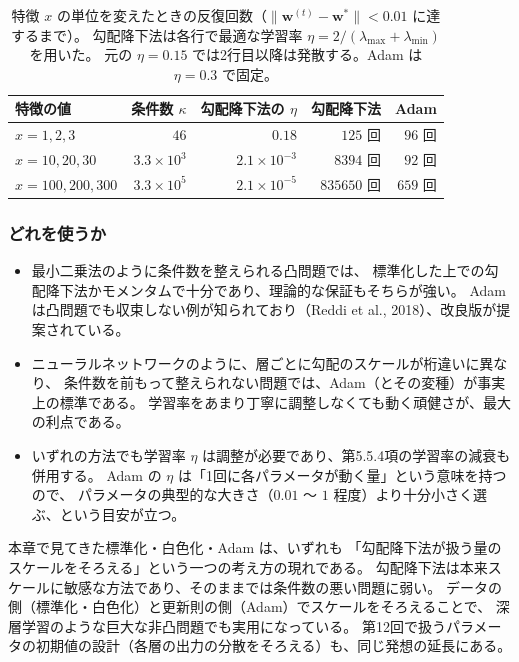 \begin{table}[H]
  \centering
  \caption{特徴 $x$ の単位を変えたときの反復回数（$\|\bm{w}^{(t)} - \bm{w}^*\| < 0.01$ に達するまで）。
  勾配降下法は各行で最適な学習率 $\eta = 2/(\lambda_{\max} + \lambda_{\min})$ を用いた。
  元の $\eta = 0.15$ では2行目以降は発散する。Adam は $\eta = 0.3$ で固定。}
  \label{tab:adam-scale}
  \begin{tabular}{l|r|r|r|r}
    \hline
    特徴の値 & 条件数 $\kappa$ & 勾配降下法の $\eta$ & 勾配降下法 & Adam \\
    \hline\hline
    $x = 1, 2, 3$       & $46$                & $0.18$                & $125$ 回     & $96$ 回 \\
    $x = 10, 20, 30$    & $3.3 \times 10^3$   & $2.1 \times 10^{-3}$  & $8394$ 回    & $92$ 回 \\
    $x = 100, 200, 300$ & $3.3 \times 10^5$   & $2.1 \times 10^{-5}$  & $835650$ 回  & $659$ 回 \\
    \hline
  \end{tabular}
\end{table}

\subsubsection{どれを使うか}

\begin{itemize}
  \item 最小二乗法のように条件数を整えられる凸問題では、
    標準化した上での勾配降下法かモメンタムで十分であり、理論的な保証もそちらが強い。
    Adam は凸問題でも収束しない例が知られており（Reddi et al., 2018）、改良版が提案されている。
  \item ニューラルネットワークのように、層ごとに勾配のスケールが桁違いに異なり、
    条件数を前もって整えられない問題では、Adam（とその変種）が事実上の標準である。
    学習率をあまり丁寧に調整しなくても動く頑健さが、最大の利点である。
  \item いずれの方法でも学習率 $\eta$ は調整が必要であり、第5.5.4項の学習率の減衰も併用する。
    Adam の $\eta$ は「1回に各パラメータが動く量」という意味を持つので、
    パラメータの典型的な大きさ（$0.01$ 〜 $1$ 程度）より十分小さく選ぶ、という目安が立つ。
\end{itemize}

本章で見てきた標準化・白色化・Adam は、いずれも
「勾配降下法が扱う量のスケールをそろえる」という一つの考え方の現れである。
勾配降下法は本来スケールに敏感な方法であり、そのままでは条件数の悪い問題に弱い。
データの側（標準化・白色化）と更新則の側（Adam）でスケールをそろえることで、
深層学習のような巨大な非凸問題でも実用になっている。
第12回で扱うパラメータの初期値の設計（各層の出力の分散をそろえる）も、同じ発想の延長にある。


